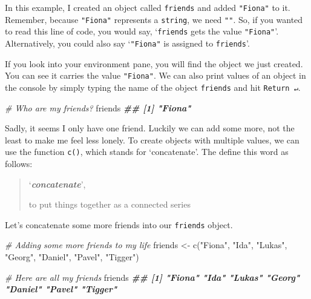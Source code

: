 \documentclass[
]{book}
\newenvironment{Shaded}{\begin{snugshade}}{\end{snugshade}}
\newcommand{\CommentTok}[1]{\textcolor[rgb]{0.56,0.35,0.01}{\textit{#1}}}
\newcommand{\DocumentationTok}[1]{\textcolor[rgb]{0.56,0.35,0.01}{\textbf{\textit{#1}}}}
\newcommand{\FunctionTok}[1]{\textcolor[rgb]{0.00,0.00,0.00}{#1}}
\newcommand{\NormalTok}[1]{#1}
\newcommand{\OtherTok}[1]{\textcolor[rgb]{0.56,0.35,0.01}{#1}}
\newcommand{\StringTok}[1]{\textcolor[rgb]{0.31,0.60,0.02}{#1}}
\begin{document}
In this example, I created an object called \texttt{friends} and added \texttt{"Fiona"} to it. Remember, because \texttt{"Fiona"} represents a \texttt{string}, we need \texttt{""}. So, if you wanted to read this line of code, you would say, `\texttt{friends} gets the value \texttt{"Fiona"}'. Alternatively, you could also say `\texttt{"Fiona"} is assigned to \texttt{friends}'.

If you look into your environment pane, you will find the object we just created. You can see it carries the value \texttt{"Fiona"}. We can also print values of an object in the console by simply typing the name of the object \texttt{friends} and hit \texttt{Return\ ↵}.

\begin{Shaded}
\begin{Highlighting}[]

\CommentTok{\# Who are my friends?}
\NormalTok{friends}
\DocumentationTok{\#\# [1] "Fiona"}
\end{Highlighting}
\end{Shaded}

Sadly, it seems I only have one friend. Luckily we can add some more, not the least to make me feel less lonely. To create objects with multiple values, we can use the function \texttt{c()}, which stands for `concatenate'. The \citet{concatenate-2021} define this word as follows:

\begin{quote}
`\textbf{\emph{concatenate}}',

to put things together as a connected series
\end{quote}

Let's concatenate some more friends into our \texttt{friends} object.

\begin{Shaded}
\begin{Highlighting}[]
\CommentTok{\# Adding some more friends to my life}
\NormalTok{friends }\OtherTok{\textless{}{-}} \FunctionTok{c}\NormalTok{(}\StringTok{"Fiona"}\NormalTok{, }\StringTok{"Ida"}\NormalTok{, }\StringTok{"Lukas"}\NormalTok{, }\StringTok{"Georg"}\NormalTok{, }\StringTok{"Daniel"}\NormalTok{, }\StringTok{"Pavel"}\NormalTok{, }\StringTok{"Tigger"}\NormalTok{)}

\CommentTok{\# Here are all my friends}
\NormalTok{friends}
\DocumentationTok{\#\# [1] "Fiona"  "Ida"    "Lukas"  "Georg"  "Daniel" "Pavel"  "Tigger"}
\end{Highlighting}
\end{Shaded}
\end{document}
